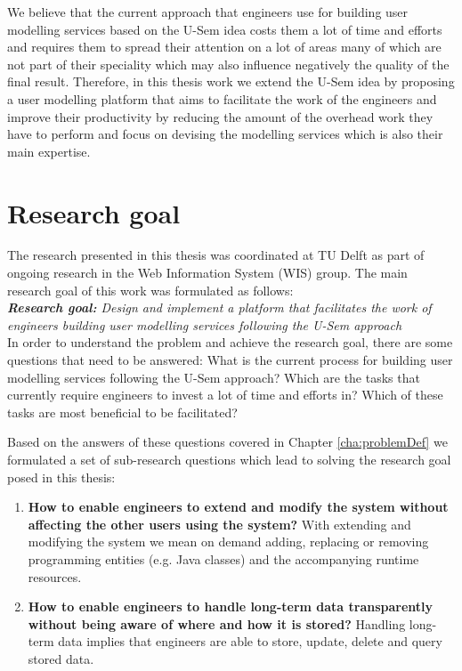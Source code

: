 We believe that the current approach that engineers use for building user modelling services based on the U-Sem idea costs them a lot of time and efforts and requires them to spread their attention on a lot of areas many of which are not part of their speciality which may also influence negatively the quality of the final result. Therefore, in this thesis work we extend the U-Sem idea by proposing a user modelling platform that aims to facilitate the work of the engineers and improve their productivity by reducing the amount of the overhead work they have to perform and focus on devising the modelling services which is also their main expertise.


\section{Research goal}

The research presented in this thesis was coordinated at TU Delft as part of ongoing research in the Web Information System (WIS) group. The main research goal of this work was formulated as follows:\\

\textit{\textbf{Research goal:} Design and implement a platform that facilitates the work of engineers building user modelling services following the U-Sem approach}\\

In order to understand the problem and achieve the research goal, there are some questions that need to be answered: What is the current process for building user modelling services following the U-Sem approach? Which are the tasks that currently require engineers to invest a lot of time and efforts in? Which of these tasks are most beneficial to be facilitated? 

Based on the answers of these questions covered in Chapter \ref{cha:problemDef} we formulated a set of sub-research questions which lead to solving the research goal posed in this thesis:

\begin{enumerate}
\item \textbf{How to enable engineers to extend and modify the system without affecting the other users using the system?}
With extending and modifying the system we mean on demand adding, replacing or removing programming entities (e.g. Java classes) and the accompanying runtime resources.

\item \textbf{How to enable engineers to handle long-term data transparently without being aware of where and how it is stored?}
Handling long-term data implies that engineers are able to store, update, delete and query stored data.

\end{enumerate}

